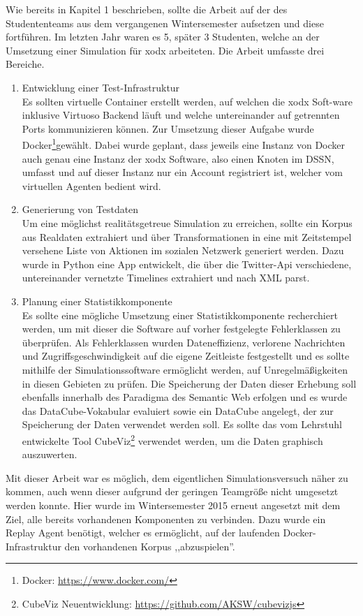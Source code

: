 \documentclass{article}
\begin{document}
Wie bereits in Kapitel 1 beschrieben, sollte die Arbeit auf der des Studententeams aus dem vergangenen Wintersemester aufsetzen und diese fortführen. Im letzten Jahr waren es 5, später 3 Studenten, welche an der Umsetzung einer Simulation für xodx arbeiteten. Die Arbeit umfasste drei Bereiche.
\begin{enumerate}
	\item{Entwicklung einer Test-Infrastruktur\\
	Es sollten virtuelle Container erstellt werden, auf welchen die xodx Soft-ware inklusive Virtuoso Backend läuft und welche untereinander auf getrennten Ports kommunizieren können. Zur Umsetzung dieser Aufgabe wurde Docker\footnote{Docker: \url{https://www.docker.com/}}gewählt. Dabei wurde geplant, dass jeweils eine Instanz von Docker auch genau eine Instanz der xodx Software, also einen Knoten im DSSN, umfasst und auf dieser Instanz nur ein Account registriert ist, welcher vom virtuellen Agenten bedient wird.}
	\item{Generierung von Testdaten\\
	Um eine möglichst realitätsgetreue Simulation zu erreichen, sollte ein Korpus aus Realdaten extrahiert und über Transformationen in eine mit Zeitstempel versehene Liste von Aktionen im sozialen Netzwerk generiert werden. Dazu wurde in Python eine App entwickelt, die über die Twitter-Api verschiedene, untereinander vernetzte Timelines extrahiert und nach XML parst.}
	\item{Planung einer Statistikkomponente\\
	Es sollte eine mögliche Umsetzung einer Statistikkomponente  recherchiert werden, um mit dieser die Software auf vorher festgelegte Fehlerklassen zu überprüfen. Als Fehlerklassen wurden Dateneffizienz, verlorene Nachrichten und Zugriffsgeschwindigkeit auf die eigene Zeitleiste festgestellt und es sollte mithilfe der Simulationssoftware ermöglicht werden, auf Unregelmäßigkeiten in diesen Gebieten zu prüfen. Die Speicherung der Daten dieser Erhebung soll ebenfalls innerhalb des Paradigma des Semantic Web erfolgen und es wurde das DataCube-Vokabular evaluiert sowie ein DataCube angelegt, der zur Speicherung der Daten verwendet werden soll. Es sollte das vom Lehrstuhl entwickelte Tool CubeViz\cite{cubeviz}\footnote{CubeViz Neuentwicklung: \url{https://github.com/AKSW/cubevizjs}} verwendet werden, um die Daten graphisch auszuwerten.}
\end{enumerate}
Mit dieser Arbeit war es möglich, dem eigentlichen Simulationsversuch näher zu kommen, auch wenn dieser aufgrund der geringen Teamgröße nicht umgesetzt werden konnte. Hier wurde im Wintersemester 2015 erneut angesetzt mit dem Ziel, alle bereits vorhandenen Komponenten zu verbinden. Dazu wurde ein Replay Agent benötigt, welcher es ermöglicht, auf der laufenden Docker-Infrastruktur den vorhandenen Korpus ,,abzuspielen''.\\
\end{document}

